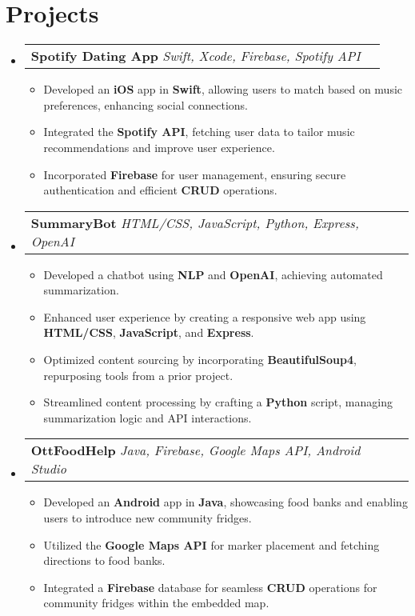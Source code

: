 \documentclass[letterpaper,11pt]{article}
\makeatletter
\newcommand{\resumeItem}[1]{
  \item\small{
    {#1 \vspace{-2pt}}
  }
}
\newcommand{\resumeSubheading}[3]{
    \item
    \begin{tabular*}{0.97\textwidth}[t]{l@{\extracolsep{\fill}}r}
      \textbf{#1} \textbar \textit{ #2} & \textbf{#3} \\
    \end{tabular*}\vspace{-4.5pt}
}
\newcommand{\resumeSubHeadingListStart}{\begin{itemize}[leftmargin=0.15in, label={}]}
\newcommand{\resumeSubHeadingListEnd}{\end{itemize}}
\newcommand{\resumeItemListStart}{\begin{itemize}}
\newcommand{\resumeItemListEnd}{\end{itemize}\vspace{-5pt}}
\makeatother
\begin{document}
\section{\textbf{\Large Projects}}
    \resumeSubHeadingListStart

        \resumeSubheading{Spotify Dating App}{Swift, Xcode, Firebase, Spotify API}{}
            \resumeItemListStart
                \resumeItem{Developed an \textbf{iOS} app in \textbf{Swift}, allowing users to match based on music preferences, enhancing social connections.}
                \resumeItem{Integrated the \textbf{Spotify API}, fetching user data to tailor music recommendations and improve user experience.}
                \resumeItem{Incorporated \textbf{Firebase} for user management, ensuring secure authentication and efficient \textbf{CRUD} operations.}
            \resumeItemListEnd

        \resumeSubheading{SummaryBot}{HTML/CSS, JavaScript, Python, Express, OpenAI}{}
            \resumeItemListStart
                \resumeItem{Developed a chatbot using \textbf{NLP} and \textbf{OpenAI}, achieving automated summarization.}
                \resumeItem{Enhanced user experience by creating a responsive web app using \textbf{HTML/CSS}, \textbf{JavaScript}, and \textbf{Express}.}
                \resumeItem{Optimized content sourcing by incorporating \textbf{BeautifulSoup4}, repurposing tools from a prior project.}
                \resumeItem{Streamlined content processing by crafting a \textbf{Python} script, managing summarization logic and API interactions.}
            \resumeItemListEnd

        \resumeSubheading{OttFoodHelp}{Java, Firebase, Google Maps API, Android Studio}{}
            \resumeItemListStart
            \resumeItem{Developed an \textbf{Android} app in \textbf{Java}, showcasing food banks and enabling users to introduce new community fridges.}
            \resumeItem{Utilized the \textbf{Google Maps API} for marker placement and fetching directions to food banks.}
                \resumeItem{Integrated a \textbf{Firebase} database for seamless \textbf{CRUD} operations for community fridges within the embedded map.}
            \resumeItemListEnd
        \resumeSubHeadingListEnd

\end{document}
